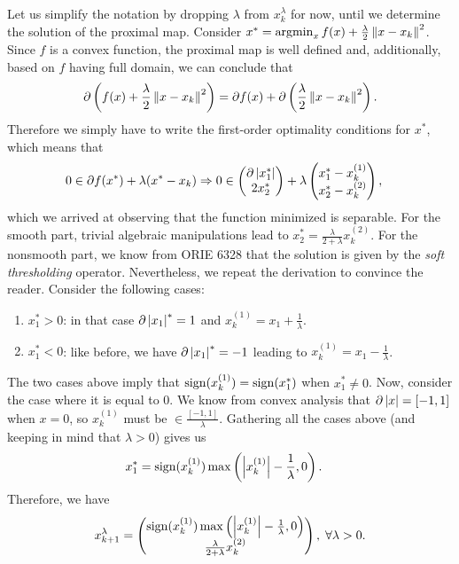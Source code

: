 \documentclass[10pt]{article}
\begin{document}
\begin{Exercise}
		Let us simplify the notation by dropping $\lambda$ from $x_k^{\lambda}$
		for now, until we determine the solution of the proximal map.
		Consider $x^* = \operatorname*{argmin}_{x} f(x) + \frac{\lambda}{2} \left \| x - x_k \right \|^2$.
		Since $f$ is a convex function, the proximal map is well defined and,
		additionally, based on $f$ having full domain, we can conclude that
		\[
			\partial \left(f(x) + \frac{\lambda}{2} \left \| x - x_k \right \|^2 \right)
			= \partial f(x) + \partial \left( \frac{\lambda}{2} \left \| x -
			x_k \right \|^2 \right).
		\]
		Therefore we simply have to write the first-order optimality conditions
		for $x^*$, which means that
		\begin{align*}
			0 &\in \partial f(x^*) + \lambda ( x^* - x_k ) \Rightarrow
			0 \in \begin{pmatrix} \partial \left| x^*_1 \right| \\ 2 x^*_2 \end{pmatrix}
				+ \lambda \begin{pmatrix} x^*_1 - x_k^{(1)} \\ x^*_2 - x_k^{(2)}
				\end{pmatrix},
		\end{align*}
		which we arrived at observing that the function minimized is separable.
		For the smooth part, trivial algebraic manipulations lead to $x_2^* =
		\frac{\lambda}{2 + \lambda} x_k^{(2)}$. For the nonsmooth part, we
		know from ORIE 6328 that the solution is given by the
		\textit{soft thresholding} operator. Nevertheless, we repeat the
		derivation to convince the reader. Consider the following cases:
		\begin{enumerate}
			\item $x^*_1 > 0$: in that case $\partial \left| x_1 \right|^* = 1$ and
				$x_k^{(1)} = x_1 + \frac{1}{\lambda}$.
			\item $x^*_1 < 0$: like before, we have $\partial \left| x_1 \right|^* = -1$
				leading to $x_k^{(1)} = x_1 - \frac{1}{\lambda}$.
		\end{enumerate}
		The two cases above imply that $\mathrm{sign}(x_k^{(1)}) = \mathrm{sign}(x_1^*)$ when
		$x_1^* \neq 0$. Now, consider the case where it is equal to $0$. We
		know from convex analysis that $\partial \left| x \right| = [-1, 1]$ when
		$x = 0$, so $x_k^{(1)}$ must be $\in \frac{[-1, 1]}{\lambda}$. Gathering all the
		cases above (and keeping in mind that $\lambda > 0$) gives us
		\begin{align*}
			x_1^* &= \mathrm{sign}(x_k^{(1)}) \max\left(\left| x_k^{(1)} \right| -
				\frac{1}{\lambda}, 0\right).
		\end{align*}
		Therefore, we have
		\[
			x_{k+1}^{\lambda} = \begin{pmatrix}
				\mathrm{sign}(x_k^{(1)}) \max\left( \left| x_k^{(1)} \right| -
				\frac{1}{\lambda}, 0 \right) \\
				\frac{\lambda}{2 + \lambda} x_k^{(2)}
			\end{pmatrix}, \; \forall \lambda > 0.
		\]

    \ExePart
\end{Exercise}
\end{document}
